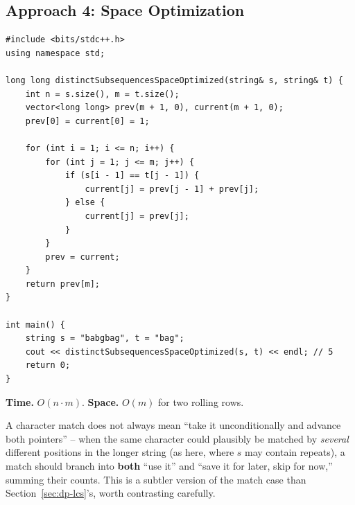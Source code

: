 \subsection*{Approach 4: Space Optimization}

\begin{lstlisting}
#include <bits/stdc++.h>
using namespace std;

long long distinctSubsequencesSpaceOptimized(string& s, string& t) {
    int n = s.size(), m = t.size();
    vector<long long> prev(m + 1, 0), current(m + 1, 0);
    prev[0] = current[0] = 1;

    for (int i = 1; i <= n; i++) {
        for (int j = 1; j <= m; j++) {
            if (s[i - 1] == t[j - 1]) {
                current[j] = prev[j - 1] + prev[j];
            } else {
                current[j] = prev[j];
            }
        }
        prev = current;
    }
    return prev[m];
}

int main() {
    string s = "babgbag", t = "bag";
    cout << distinctSubsequencesSpaceOptimized(s, t) << endl; // 5
    return 0;
}
\end{lstlisting}

\begin{complexitybox}
\textbf{Time.} $O(n \cdot m)$.
\textbf{Space.} $O(m)$ for two rolling rows.
\end{complexitybox}

\begin{takeawaybox}
A character match does not always mean ``take it unconditionally and
advance both pointers'' -- when the same character could plausibly be
matched by \emph{several} different positions in the longer string (as
here, where $s$ may contain repeats), a match should branch into
\textbf{both} ``use it'' and ``save it for later, skip for now,''
summing their counts. This is a subtler version of the match case than
Section~\ref{sec:dp-lcs}'s, worth contrasting carefully.
\end{takeawaybox}
